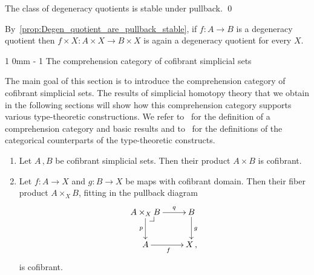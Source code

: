 \documentclass[reqno,10pt,a4paper,oneside]{amsart}
\makeatletter
\renewcommand{\section}{\@startsection
{section}%
{1}%
{0mm}%
{-\baselineskip}%
{1\baselineskip}%
{\Large \bfseries}}%
\numberwithin{equation}{section}
\theoremstyle{mythm}
\theoremstyle{mydef}
\theoremstyle{myrmk}
\newcommand{\pullback}[1]{\save*!/#1-1.2pc/#1:(-1,1)@^{|-}\restore}
\newcommand{\drpullback}{\pullback{dr}}
\newcommand{\co}{\colon}
\makeatother
\begin{document}
\begin{proposition}
\label{prop:Degen_quotient_are_pullback_stable}
The class of degeneracy quotients is stable under pullback.  \qed
\end{proposition}


By~\cref{prop:Degen_quotient_are_pullback_stable}, if $f \co A \rightarrow B$ is a degeneracy quotient  then $f \times X \co A \times X \rightarrow B \times X$ is again a degeneracy quotient for every $X$.


\section{The comprehension category of cofibrant simplicial sets}
\label{sec:basrp}

The main goal of this section is to introduce the comprehension category of cofibrant simplicial sets. The
results of simplicial homotopy theory that we obtain in the following sections will show how this 
comprehension category supports various type-theoretic constructions. We refer to~\cite{JacobsB:catltt} for the definition of a comprehension category and basic results and to~\cite{LumsdaineP:locuoc} for the
definitions of the categorical counterparts of the type-theoretic constructs.  


\begin{lemma}\label{lem:cofibrant_fiber_product} \hfill 
\begin{enumerate}[$(i)$] 
\item Let $A \, , B$ be cofibrant simplicial sets. Then their product $A \times B$ is cofibrant.
\item Let $f \co A \to X$ and $g \co B \to X$ be maps with  cofibrant domain. Then their
fiber product $A \times_X B$, fitting in the pullback diagram
\[
\xymatrix{
A \times_X B \drpullback \ar[r]^-{q} \ar[d]_-{p} & B \ar[d]^g \\
A \ar[r]_f & X \, ,}
\]
is cofibrant.
\end{enumerate}
\end{lemma}
\end{document}
